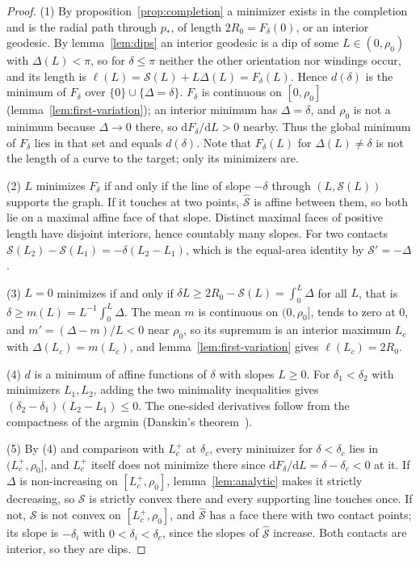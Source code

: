 \documentclass[aip,jmp,amsmath,amssymb,reprint]{revtex4-2}
\newcommand{\dd}{\mathrm{d}}
\theoremstyle{plain}
\theoremstyle{definition}
\begin{document}
\begin{proof}
(1) By proposition~\ref{prop:completion} a minimizer exists in the completion and is the
radial path through $p_*$, of length $2R_0=F_\delta(0)$, or an interior geodesic. By
lemma~\ref{lem:dips} an interior geodesic is a dip of some $L\in(0,\rho_0)$ with
$\Delta(L)<\pi$, so for $\delta\le\pi$ neither the other orientation nor windings occur, and
its length is $\ell(L)=\mathcal S(L)+L\Delta(L)=F_\delta(L)$. Hence $d(\delta)$ is the minimum of
$F_\delta$ over $\{0\}\cup\{\Delta=\delta\}$. $F_\delta$ is continuous on $[0,\rho_0]$
(lemma~\ref{lem:first-variation}); an interior minimum has $\Delta=\delta$, and $\rho_0$ is not a
minimum because $\Delta\to0$ there, so $\dd F_\delta/\dd L>0$ nearby. Thus the global minimum
of $F_\delta$ lies in that set and equals $d(\delta)$. Note that $F_\delta(L)$ for
$\Delta(L)\neq\delta$ is not the length of a curve to the target; only its minimizers are.

(2) $L$ minimizes $F_\delta$ if and only if the line of slope $-\delta$ through $(L,\mathcal S(L))$
supports the graph. If it touches at two points, $\hat{\mathcal S}$ is affine between them, so
both lie on a maximal affine face of that slope. Distinct maximal faces of positive length
have disjoint interiors, hence countably many slopes. For two contacts
$\mathcal S(L_2)-\mathcal S(L_1)=-\delta(L_2-L_1)$, which is the equal-area identity by
$\mathcal S'=-\Delta$.

(3) $L=0$ minimizes if and only if $\delta L\ge2R_0-\mathcal S(L)=\int_0^L\Delta$ for all $L$,
that is $\delta\ge m(L)=L^{-1}\int_0^L\Delta$. The mean $m$ is continuous on $(0,\rho_0]$, tends
to zero at $0$, and $m'=(\Delta-m)/L<0$ near $\rho_0$, so its supremum is an interior maximum
$L_c$ with $\Delta(L_c)=m(L_c)$, and lemma~\ref{lem:first-variation} gives $\ell(L_c)=2R_0$.

(4) $d$ is a minimum of affine functions of $\delta$ with slopes $L\ge0$. For $\delta_1<\delta_2$
with minimizers $L_1,L_2$, adding the two minimality inequalities gives
$(\delta_2-\delta_1)(L_2-L_1)\le0$. The one-sided derivatives follow from the compactness of the
argmin (Danskin's theorem~\cite{Danskin1966}).

(5) By (4) and comparison with $L_c^+$ at $\delta_c$, every minimizer for $\delta<\delta_c$ lies in
$(L_c^+,\rho_0]$, and $L_c^+$ itself does not minimize there since $\dd F_\delta/\dd L=\delta-\delta_c<0$
at it. If $\Delta$ is non-increasing on $[L_c^+,\rho_0]$, lemma~\ref{lem:analytic} makes it
strictly decreasing, so $\mathcal S$ is strictly convex there and every supporting line touches
once. If not, $\mathcal S$ is not convex on $[L_c^+,\rho_0]$, and $\hat{\mathcal S}$ has a face there
with two contact points; its slope is $-\delta_i$ with $0<\delta_i<\delta_c$, since the slopes of
$\hat{\mathcal S}$ increase. Both contacts are interior, so they are dips.
\end{proof}
\end{document}
